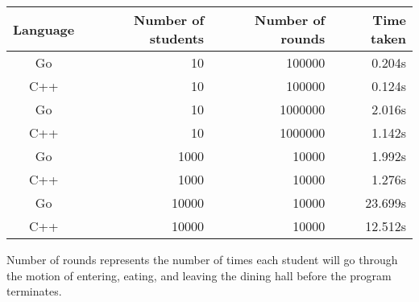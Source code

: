 \documentclass[11pt]{article}
\begin{document}
\begin{tabular}{c r r r}
Language    & Number of students & Number of rounds & Time taken \\
\toprule
Go 			& 10 & 100000 & 0.204s \\
C++         & 10 & 100000 & 0.124s \\
\cmidrule{1-4}
Go 			& 10 & 1000000 & 2.016s \\
C++         & 10 & 1000000 & 1.142s \\
\cmidrule{1-4}
Go 			& 1000 & 10000 & 1.992s \\
C++         & 1000 & 10000 & 1.276s \\
\cmidrule{1-4}
Go 			& 10000 & 10000 & 23.699s \\
C++         & 10000 & 10000 & 12.512s \\
\end{tabular}
\newline
Number of rounds represents the number of times each student will go through the motion of entering, eating, and leaving the dining hall before the program terminates.
\pagebreak
\end{document}
